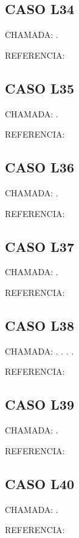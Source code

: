 \documentclass{undftex}
\begin{document}
\begin{refsection}\section*{CASO L34} CHAMADA: . \textcite{l34}\par REFERENCIA:\par\printbibliography[heading=none,check=undfconsultadas]\end{refsection}\clearpage
\begin{refsection}\section*{CASO L35} CHAMADA: . \textcite{l35}\par REFERENCIA:\par\printbibliography[heading=none,check=undfconsultadas]\end{refsection}\clearpage
\begin{refsection}\section*{CASO L36} CHAMADA: . \textcite{l36a}\par REFERENCIA:\par\printbibliography[heading=none,check=undfconsultadas]\end{refsection}\clearpage
\begin{refsection}\section*{CASO L37} CHAMADA: . \textcite{l37}\par REFERENCIA:\par\printbibliography[heading=none,check=undfconsultadas]\end{refsection}\clearpage
\begin{refsection}\section*{CASO L38} CHAMADA: . \textcite{l38}. . . \par REFERENCIA:\par\printbibliography[heading=none,check=undfconsultadas]\end{refsection}\clearpage
\begin{refsection}\section*{CASO L39} CHAMADA: . \textcite{l39}\par REFERENCIA:\par\printbibliography[heading=none,check=undfconsultadas]\end{refsection}\clearpage
\begin{refsection}\section*{CASO L40} CHAMADA: . \textcite{l40}\par REFERENCIA:\par\printbibliography[heading=none,check=undfconsultadas]\end{refsection}\clearpage
\end{document}
